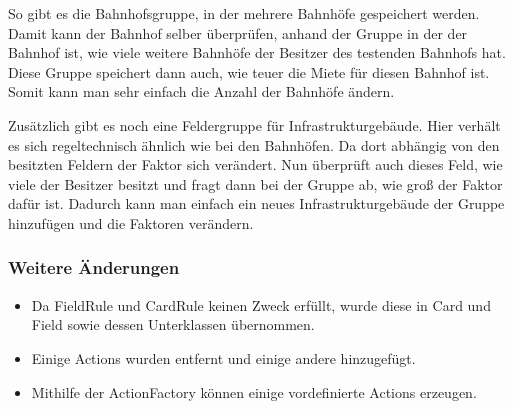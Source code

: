 \documentclass[a4paper,10pt]{article}
\begin{document}
\begin{itemize}
So gibt es die Bahnhofsgruppe, in der mehrere Bahnhöfe gespeichert werden. Damit kann der Bahnhof selber überprüfen, anhand der Gruppe in der der Bahnhof ist, wie viele weitere Bahnhöfe der Besitzer des testenden Bahnhofs hat. Diese Gruppe speichert dann auch, wie teuer die Miete für diesen Bahnhof ist. Somit kann man sehr einfach die Anzahl der Bahnhöfe ändern.

Zusätzlich gibt es noch eine Feldergruppe für Infrastrukturgebäude. Hier verhält es sich regeltechnisch ähnlich wie bei den Bahnhöfen. Da dort abhängig von den besitzten Feldern der Faktor sich verändert. Nun überprüft auch dieses Feld, wie viele der Besitzer besitzt und fragt dann bei der Gruppe ab, wie groß der Faktor dafür ist. Dadurch kann man einfach ein neues Infrastrukturgebäude der Gruppe hinzufügen und die Faktoren verändern.
\subsubsection{Weitere Änderungen}
\begin{itemize}
\item Da FieldRule und CardRule keinen Zweck erfüllt, wurde diese in Card und Field sowie dessen Unterklassen übernommen.
\item Einige Actions wurden entfernt und einige andere hinzugefügt.
\item Mithilfe der ActionFactory können einige vordefinierte Actions erzeugen.
\end{itemize}

\end{itemize}
\end{document}
